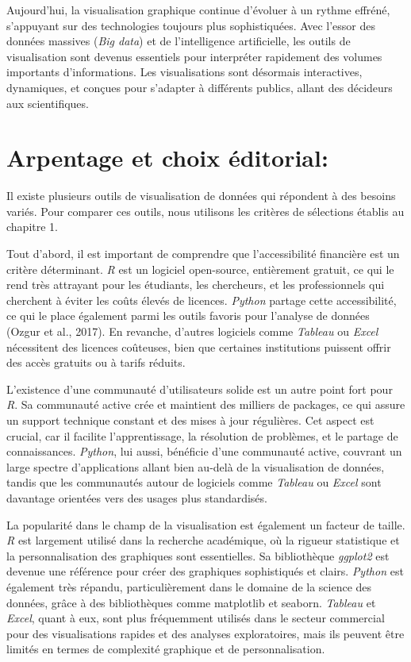 \documentclass[
  letterpaper,
  DIV=11,
  numbers=noendperiod]{scrreprt}
\begin{document}
Aujourd'hui, la visualisation graphique continue d'évoluer à un rythme
effréné, s'appuyant sur des technologies toujours plus sophistiquées.
Avec l'essor des données massives (\emph{Big data}) et de l'intelligence
artificielle, les outils de visualisation sont devenus essentiels pour
interpréter rapidement des volumes importants d'informations. Les
visualisations sont désormais interactives, dynamiques, et conçues pour
s'adapter à différents publics, allant des décideurs aux scientifiques.

\hypertarget{arpentage-et-choix-uxe9ditorial}{%
\section{Arpentage et choix
éditorial:}\label{arpentage-et-choix-uxe9ditorial}}

Il existe plusieurs outils de visualisation de données qui répondent à
des besoins variés. Pour comparer ces outils, nous utilisons les
critères de sélections établis au chapitre 1.

Tout d'abord, il est important de comprendre que l'accessibilité
financière est un critère déterminant. \emph{R} est un logiciel
open-source, entièrement gratuit, ce qui le rend très attrayant pour les
étudiants, les chercheurs, et les professionnels qui cherchent à éviter
les coûts élevés de licences. \emph{Python} partage cette accessibilité,
ce qui le place également parmi les outils favoris pour l'analyse de
données (Ozgur et al., 2017). En revanche, d'autres logiciels comme
\emph{Tableau} ou \emph{Excel} nécessitent des licences coûteuses, bien
que certaines institutions puissent offrir des accès gratuits ou à
tarifs réduits.

L'existence d'une communauté d'utilisateurs solide est un autre point
fort pour \emph{R}. Sa communauté active crée et maintient des milliers
de packages, ce qui assure un support technique constant et des mises à
jour régulières. Cet aspect est crucial, car il facilite
l'apprentissage, la résolution de problèmes, et le partage de
connaissances. \emph{Python}, lui aussi, bénéficie d'une communauté
active, couvrant un large spectre d'applications allant bien au-delà de
la visualisation de données, tandis que les communautés autour de
logiciels comme \emph{Tableau} ou \emph{Excel} sont davantage orientées
vers des usages plus standardisés.

La popularité dans le champ de la visualisation est également un facteur
de taille. \emph{R} est largement utilisé dans la recherche académique,
où la rigueur statistique et la personnalisation des graphiques sont
essentielles. Sa bibliothèque \emph{ggplot2} est devenue une référence
pour créer des graphiques sophistiqués et clairs. \emph{Python} est
également très répandu, particulièrement dans le domaine de la science
des données, grâce à des bibliothèques comme matplotlib et seaborn.
\emph{Tableau} et \emph{Excel}, quant à eux, sont plus fréquemment
utilisés dans le secteur commercial pour des visualisations rapides et
des analyses exploratoires, mais ils peuvent être limités en termes de
complexité graphique et de personnalisation.
\end{document}
